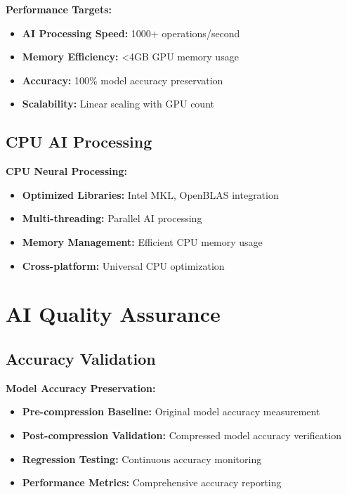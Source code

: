 \documentclass[12pt,a4paper]{article}
\begin{document}
\textbf{Performance Targets:}
\begin{itemize}
    \item \textbf{AI Processing Speed:} 1000+ operations/second
    \item \textbf{Memory Efficiency:} <4GB GPU memory usage
    \item \textbf{Accuracy:} 100\% model accuracy preservation
    \item \textbf{Scalability:} Linear scaling with GPU count
\end{itemize}

\subsection{CPU AI Processing}

\textbf{CPU Neural Processing:}
\begin{itemize}
    \item \textbf{Optimized Libraries:} Intel MKL, OpenBLAS integration
    \item \textbf{Multi-threading:} Parallel AI processing
    \item \textbf{Memory Management:} Efficient CPU memory usage
    \item \textbf{Cross-platform:} Universal CPU optimization
\end{itemize}

\section{AI Quality Assurance}

\subsection{Accuracy Validation}

\textbf{Model Accuracy Preservation:}
\begin{itemize}
    \item \textbf{Pre-compression Baseline:} Original model accuracy measurement
    \item \textbf{Post-compression Validation:} Compressed model accuracy verification
    \item \textbf{Regression Testing:} Continuous accuracy monitoring
    \item \textbf{Performance Metrics:} Comprehensive accuracy reporting
\end{itemize}
\end{document}
